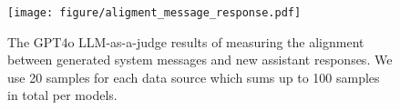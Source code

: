 \begin{figure}[t]
\centering
\texttt{[image: figure/aligment\_message\_response.pdf]}
\caption{
The GPT4o LLM-as-a-judge results of measuring the alignment between generated system messages and new assistant responses. We use 20 samples for each data source which sums up to 100 samples in total per models.
}
\label{fig:alignment_message_response}
\vspace{-0.3cm}
\end{figure}